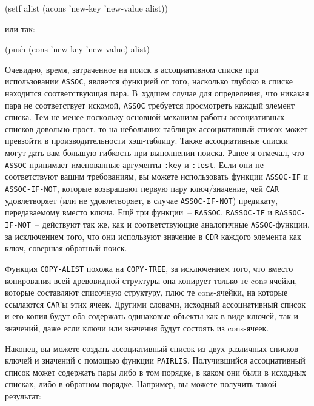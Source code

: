 \begin{myverb}
(setf alist (acons 'new-key 'new-value alist))
\end{myverb}

\noindent{}или так:

\begin{myverb}
(push (cons 'new-key 'new-value) alist)
\end{myverb}

Очевидно, время, затраченное на поиск в ассоциативном списке при использовании
\lstinline{ASSOC}, является функцией от того, насколько глубоко в списке находится
соответствующая пара. В~худшем случае для определения, что никакая пара не соответствует
искомой, \lstinline{ASSOC} требуется просмотреть каждый элемент списка. Тем не менее поскольку
основной механизм работы ассоциативных списков довольно прост, то на небольших таблицах
ассоциативный список может превзойти в производительности хэш-таблицу.  Также
ассоциативные списки могут дать вам большую гибкость при выполнении поиска. Ранее я
отмечал, что \lstinline{ASSOC} принимает именованные аргументы \lstinline{:key} и \lstinline{:test}. Если
они не соответствуют вашим требованиям, вы можете использовать функции \lstinline{ASSOC-IF} и
\lstinline{ASSOC-IF-NOT}, которые возвращают первую пару ключ/значение, чей \lstinline{CAR}
удовлетворяет (или не удовлетворяет, в случае \lstinline{ASSOC-IF-NOT}) предикату,
передаваемому вместо ключа. Ещё три функции~-- \lstinline{RASSOC}, \lstinline{RASSOC-IF} и
\lstinline{RASSOC-IF-NOT}~-- действуют так же, как и соответствующие аналогичные
\lstinline{ASSOC}-функции, за исключением того, что они используют значение в \lstinline{CDR}
каждого элемента как ключ, совершая обратный поиск.

Функция \lstinline{COPY-ALIST} похожа на \lstinline{COPY-TREE}, за исключением того, что вместо
копирования всей древовидной структуры она копирует только те cons-ячейки, которые
составляют списочную структуру, плюс те cons-ячейки, на которые ссылаются \lstinline{CAR}'ы
этих ячеек. Другими словами, исходный ассоциативный список и его копия будут оба содержать
одинаковые объекты как в виде ключей, так и значений, даже если ключи или значения будут
состоять из cons-ячеек.

Наконец, вы можете создать ассоциативный список из двух различных списков ключей и значений
с помощью функции \lstinline{PAIRLIS}. Получившийся ассоциативный список может содержать пары
либо в том порядке, в каком они были в исходных списках, либо в обратном
порядке. Например, вы можете получить такой результат:

